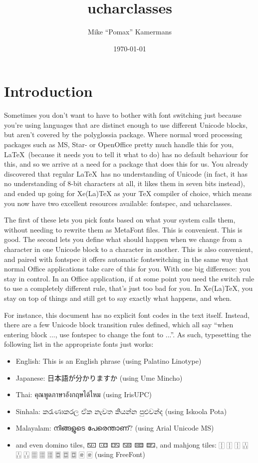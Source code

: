 ﻿\documentclass{article}
\newenvironment{itemlist}{%
  \begin{itemize}
	\setlength{\itemsep}{0pt}
	\setlength{\parsep}{0pt}
	\setlength{\topsep}{0pt}
	\setlength{\partopsep}{0pt}
	\setlength{\parskip}{0pt}
	\setlength{\labelsep}{5pt}}%
{
  \end{itemize}}
\begin{document}
	\title{ucharclasses}
	\author{Mike “Pomax” Kamermans}
	\date{\today}
	\maketitle

	\tableofcontents

	\pagebreak

	\section{Introduction}
	
		Sometimes you don't want to have to bother with font switching just because you're using languages that are distinct enough to use different Unicode blocks, but aren't covered by the polyglossia package. Where normal word processing packages such as MS, Star- or OpenOffice pretty much handle this for you, \LaTeX\ (because it needs you to tell it what to do) has no default behaviour for this, and so we arrive at a need for a package that does this for us. You already discovered that regular \LaTeX\ has no understanding of Unicode (in fact, it has no understanding of 8-bit characters at all, it likes them in seven bits instead), and ended up going for Xe(La)TeX as your TeX compiler of choice, which means you now have two excellent resources available: fontspec, and ucharclasses.
		
		The first of these lets you pick fonts based on what your system calls them, without needing to rewrite them as MetaFont files. This is convenient. This is good. The second lets you define what should happen when we change from a character in one Unicode block to a character in another. This is also convenient, and paired with fontspec it offers automatic fontswitching in the same way that normal Office applications take care of this for you. With one big difference: you stay in control. In an Office application, if at some point you need the switch rule to use a completely different rule, that's just too bad for you. In Xe(La)TeX, you stay on top of things and still get to say exactly what happens, and when.
		
		For instance, this document has no explicit font codes in the text itself. Instead, there are a few Unicode block transition rules defined, which all say “when entering block ..., use fontspec to change the font to ...”. As such, typesetting the following list in the appropriate fonts just works:
		
		\begin{itemlist}
			\item English: This is an English phrase (using Palatino Linotype)
			\item Japanese: 日本語が分かりますか (using Ume Mincho)
			\item Thai: คุณพูดภาษาอังกฤษได้ไหม (using IrisUPC)
			\item Sinhala: කරැණාකරල ඒක නැවත කියන්න පුළුවන්ද (using Iskoola Pota)
			\item Malayalam: നിങ്ങളുടെ പേരെന്താണ്? (using Arial Unicode MS)
			\item and even domino tiles, 🁇 🀼 🁐 🁋 🁚 🁝, and mahjong tiles: 🀑 🀑 🀑 🀒 🀒 🀒 🀕 🀕 🀕 🀗 🀗 🀗 🀅 🀅 (using FreeFont)
		\end{itemlist}
\end{document}
